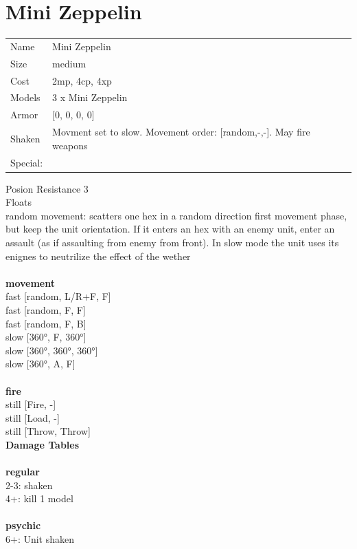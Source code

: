 \clearpage

\section{ Mini Zeppelin }

\begin{tabular}{ll}
  Name & Mini Zeppelin \\
  Size & medium\\
  Cost & 2mp, 4cp, 4xp\\
  Models & 3 x Mini Zeppelin\\
  Armor & [0, 0, 0, 0]\\
  Shaken & Movment set to slow. Movement order: [random,-,-]. May fire weapons\\
  Special: \\
\end{tabular}

\noindent Posion Resistance 3\\ 
Floats\\ 
random movement: scatters one hex in a random direction first movement phase, but keep the unit orientation. If it enters an hex with an enemy unit, enter an assault (as if assaulting from enemy from front). In slow mode the unit uses its enignes to neutrilize the effect of the wether\\ 


\ \\ {\bf movement } \\
fast [random, L/R+F, F] \\
fast [random, F, F] \\
fast [random, F, B] \\
slow [360°, F, 360°] \\
slow [360°, 360°, 360°] \\
slow [360°, A, F] \\
\ \\ {\bf fire } \\
still [Fire, -] \\
still [Load, -] \\
still [Throw, Throw] \\


{\bf Damage Tables} \\
\ \\ {\bf regular } \\
2-3: shaken \\
4+: kill 1 model \\
\ \\ {\bf psychic } \\
6+: Unit shaken \\


